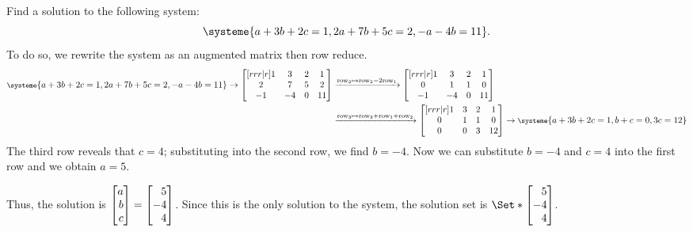 	\begin{example}
		Find a solution to the following system:
		\[
			\systeme{
				a+3b+2c=1,
				2a+7b+5c=2,
				-a-4b=11
			}.
		\]
		To do so, we rewrite the system as an augmented matrix then row reduce.
		\begin{align*}
			{\footnotesize
			\systeme{
				a+3b+2c=1,
				2a+7b+5c=2,
				-a-4b=11
			}
			} \rightarrow
			\begin{bmatrix}[rrr|r]
				1&3&2 & 1\\
				2&7&5 & 2\\
				-1&-4&0 & 11
			\end{bmatrix}
			&\xrightarrow{\text{row}_2\mapsto\text{row}_2-2\text{row}_1}
			\begin{bmatrix}[rrr|r]
				1&3&2 & 1\\
				0&1&1 & 0\\
				-1&-4&0 & 11
			\end{bmatrix}\\
			&\xrightarrow{\text{row}_3\mapsto\text{row}_3+\text{row}_1+\text{row}_2}
			\begin{bmatrix}[rrr|r]
				1&3&2 & 1\\
				0&1&1 & 0\\
				0&0&3 & 12
			\end{bmatrix}
			\rightarrow
			{\footnotesize
				\systeme{
				a+3b+2c=1,
				b+c=0,
				3c=12
				}
			}
		\end{align*}
		The third row reveals that $c=4$; substituting into the second row, we find $b=-4$. Now we can substitute $b=-4$ and $c=4$ into the first row and we obtain $a=5$.
		
		Thus, the solution is $\mat{a\\b\\c}=\mat{5\\-4\\4}$. Since this is the only solution to the system, the solution set is $\Set*{\mat{5\\-4\\4}}$.
	\end{example}


